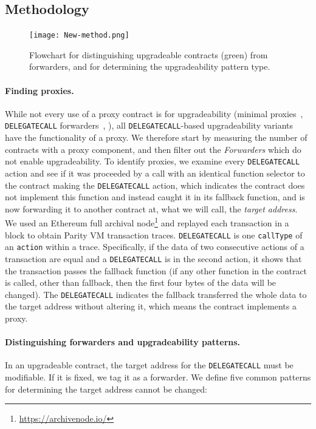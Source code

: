 \subsection{Methodology} 

\begin{figure}[t!]
  \texttt{[image: New-method.png]}\label{flowchart}
  \caption{Flowchart for distinguishing upgradeable contracts (green) from forwarders, and for determining the upgradeability pattern type.}
\end{figure}


\paragraph{Finding proxies.} While not every use of a proxy contract is for upgradeability (\eg minimal proxies~\cite{minimalProxy}, \texttt{DELEGATECALL} forwarders~\cite{delegatecallForwarders}, \etc), all \texttt{DELEGATECALL}-based upgradeability variants have the functionality of a proxy. We therefore start by measuring the number of contracts with a proxy component, and then filter out the \textit{Forwarders} which do not enable upgradeability. To identify proxies, we examine every \texttt{DELEGATECALL} action and see if it was proceeded by a call with an identical function selector to the contract making the \texttt{DELEGATECALL} action, which indicates   the contract does not implement this function and instead caught it in its fallback function, and is now forwarding it to another contract at, what we will call, the \textit{target address}. We used an Ethereum full archival node\footnote{\url{https://archivenode.io/}} and replayed each transaction in a block to obtain Parity VM transaction traces. \texttt{DELEGATECALL} is one \texttt{callType} of an \texttt{action} within a trace. Specifically, if the data of two consecutive actions of a transaction are equal and a \texttt{DELEGATECALL} is in the second action, it shows that the transaction passes the fallback function (if any other function in the contract is called, other than fallback, then the first four bytes of the data will be changed). The \texttt{DELEGATECALL} indicates the fallback transferred the whole data to the target address without altering it, which means the contract implements a proxy.

\paragraph{Distinguishing forwarders and upgradeability patterns.} In an upgradeable contract, the target address for the \texttt{DELEGATECALL} must be modifiable. If it is fixed, we tag it as a forwarder. We define five common patterns for determining the target address cannot be changed:

